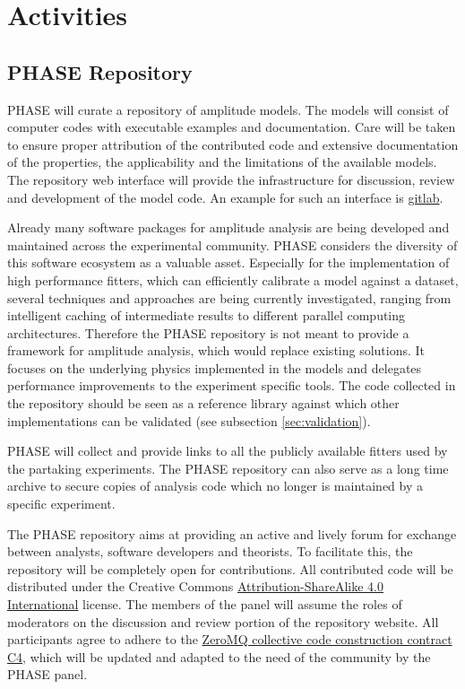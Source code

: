 \section{Activities}
\label{sec:activities}

\subsection{PHASE Repository}
\label{sec:repo}
PHASE will curate a repository of amplitude models. The models will consist of computer codes with executable examples and documentation. Care will be taken to ensure proper attribution of the contributed code and extensive documentation of the properties, the applicability and the limitations of the available models. The repository web interface will provide the infrastructure for discussion, review and development of the model code. An example for such an interface is \href{https://about.gitlab.com/}{gitlab}. 

Already many software packages for amplitude analysis are being developed and maintained across the experimental community. PHASE considers the diversity of this software ecosystem as a valuable asset. Especially for the implementation of high performance fitters, which can efficiently calibrate a model against a dataset, several techniques and approaches are being currently investigated, ranging from intelligent caching of intermediate results to different parallel computing architectures. Therefore the PHASE repository is not meant to provide a framework for amplitude analysis, which would replace existing solutions. It focuses on the underlying physics implemented in the models and delegates performance improvements to the experiment specific tools. The code collected in the repository should be seen as a reference library against which other implementations can be validated (see subsection \ref{sec:validation}). 

PHASE will collect and provide links to all the publicly available fitters used by the partaking experiments. The PHASE repository can also serve as a long time archive to secure copies of analysis code which no longer is maintained by a specific experiment.

The PHASE repository aims at providing an active and lively forum for exchange between analysts, software developers and theorists. To facilitate this, the repository will be completely open for contributions. All contributed code will be distributed under the Creative Commons
\href{https://creativecommons.org/licenses/by-sa/4.0/}{Attribution-ShareAlike 4.0 International} license. The members of the panel will assume the roles of moderators on the discussion and review portion of the repository website. All participants agree to adhere to the \href{https://rfc.zeromq.org/spec:42/C4/}{ZeroMQ collective code construction contract C4}, which will be updated and adapted to the need of the community by the PHASE panel.

